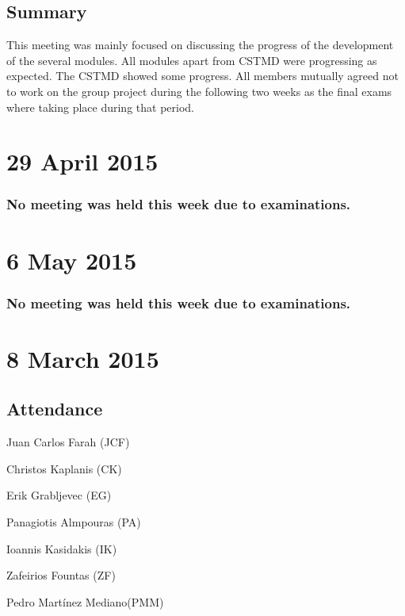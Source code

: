 \documentclass[a4paper,11pt]{article}
\begin{document}
\subsection*{Summary}
This meeting was mainly focused on discussing the progress of the development of the several modules. All modules apart from CSTMD were progressing as expected. The CSTMD showed some progress. All members mutually agreed not to work on the group project during the following two weeks as the final exams where taking place during that period.

\maketitle
\section*{29 April 2015}
\subsubsection*{No meeting was held this week due to examinations.}

\maketitle
\section*{6 May 2015}
\subsubsection*{No meeting was held this week due to examinations.}

\maketitle
\section*{8 March 2015}
\subsection*{Attendance}
\begin{compactenum}
\item Juan Carlos Farah (JCF)
\item Christos Kaplanis (CK)
\item Erik Grabljevec (EG)
\item Panagiotis Almpouras (PA)
\item Ioannis Kasidakis (IK)
\item Zafeirios Fountas (ZF)
\item Pedro Martínez Mediano(PMM)
\end{compactenum}
\end{document}
